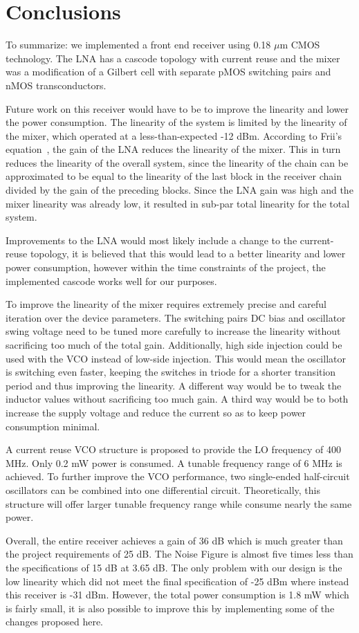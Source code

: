\section{Conclusions}

To summarize: we implemented a front end receiver using 0.18 $\mu$m CMOS technology. The LNA has a cascode topology with current reuse and the mixer was a modification of a Gilbert cell with separate pMOS switching pairs and nMOS transconductors. 

Future work on this receiver would have to be to improve the linearity and lower the power consumption. The linearity of the system is limited by the linearity of the mixer, which operated at a less-than-expected -12 dBm. According to Frii's equation~\cite{Razavi}, the gain of the LNA reduces the linearity of the mixer. This in turn reduces the linearity of the overall system, since the linearity of the chain can be approximated to be equal to the linearity of the last block in the receiver chain divided by the gain of the preceding blocks. Since the LNA gain was high and the mixer linearity was already low, it resulted in sub-par total linearity for the total system. 

Improvements to the LNA would most likely include a change to the current-reuse topology, it is believed that this would lead to a better linearity and lower power consumption, however within the time constraints of the project, the implemented cascode works well for our purposes.

To improve the linearity of the mixer requires extremely precise and careful iteration over the device parameters. The switching pairs DC bias and oscillator swing voltage need to be tuned more carefully to increase the linearity without sacrificing too much of the total gain. Additionally, high side injection could be used with the VCO instead of low-side injection. This would mean the oscillator is switching even faster, keeping the switches in triode for a shorter transition period and thus improving the linearity. A different way would be to tweak the inductor values without sacrificing too much gain. A third way would be to both increase the supply voltage and reduce the current so as to keep power consumption minimal.

A current reuse VCO structure is proposed to provide the LO frequency of 400 MHz. Only 0.2 mW power is consumed. A tunable frequency range of 6 MHz is achieved. To further improve the VCO performance, two single-ended half-circuit oscillators can be combined into one differential circuit. Theoretically, this structure will offer larger tunable frequency range while consume nearly the same power.

Overall, the entire receiver achieves a gain of 36 dB which is much greater than the project requirements of 25 dB. The Noise Figure is almost five times less than the specifications of 15 dB  at 3.65 dB. The only problem with our design is the low linearity which did not meet the final specification of -25 dBm where instead this receiver is -31 dBm. However, the total power consumption is 1.8 mW which is fairly small, it is also possible to improve this by implementing some of the changes proposed here. 
